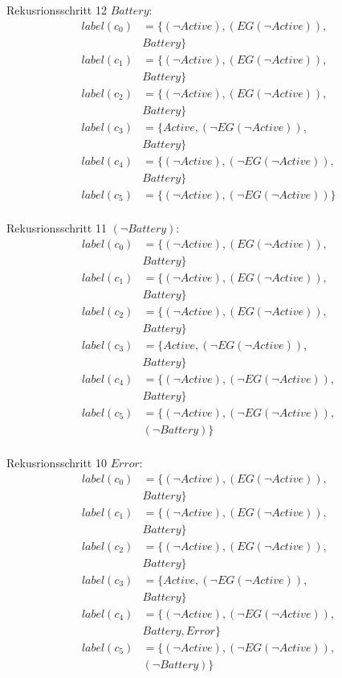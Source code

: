 Rekusrionsschritt 12 $Battery$:
\begin{align*}
label(c_0)&=\{(\neg Active),(EG(\neg Active)),\\
&Battery\}\\
label(c_1)&=\{(\neg Active),(EG(\neg Active)),\\
&Battery\}\\
label(c_2)&=\{(\neg Active),(EG(\neg Active)),\\
&Battery\}\\
label(c_3)&=\{Active,(\neg EG(\neg Active)),\\
&Battery\}\\
label(c_4)&=\{(\neg Active),(\neg EG(\neg Active)),\\
&Battery\}\\
label(c_5)&=\{(\neg Active),(\neg EG(\neg Active))\}\\
\end{align*}

Rekusrionsschritt 11 $(\neg Battery)$:
\begin{align*}
label(c_0)&=\{(\neg Active),(EG(\neg Active)),\\
&Battery\}\\
label(c_1)&=\{(\neg Active),(EG(\neg Active)),\\
&Battery\}\\
label(c_2)&=\{(\neg Active),(EG(\neg Active)),\\
&Battery\}\\
label(c_3)&=\{Active,(\neg EG(\neg Active)),\\
&Battery\}\\
label(c_4)&=\{(\neg Active),(\neg EG(\neg Active)),\\
&Battery\}\\
label(c_5)&=\{(\neg Active),(\neg EG(\neg Active)),\\
&(\neg Battery)\}\\
\end{align*}

Rekusrionsschritt 10 $Error$:
\begin{align*}
label(c_0)&=\{(\neg Active),(EG(\neg Active)),\\
&Battery\}\\
label(c_1)&=\{(\neg Active),(EG(\neg Active)),\\
&Battery\}\\
label(c_2)&=\{(\neg Active),(EG(\neg Active)),\\
&Battery\}\\
label(c_3)&=\{Active,(\neg EG(\neg Active)),\\
&Battery\}\\
label(c_4)&=\{(\neg Active),(\neg EG(\neg Active)),\\
&Battery,Error\}\\
label(c_5)&=\{(\neg Active),(\neg EG(\neg Active)),\\
&(\neg Battery)\}\\
\end{align*}

